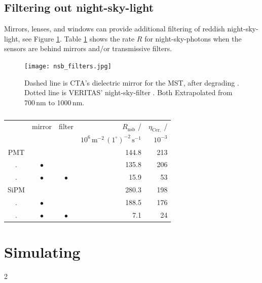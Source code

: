 \documentclass{article}%
\begin{document}
\begin{multicols}{2}
\subsection*{Filtering out night-sky-light}%
\label{SubSecFilteringOutNightSkyLight}%
%
Mirrors, lenses, and windows can provide additional filtering of reddish night-sky-light, see Figure \ref{FigNsbFilter}.
%
Table \ref{TabFilters} shows the rate $R$ for night-sky-photons when the sensors are behind mirrors and/or transmissive filters.
%
\begin{figure}[H]%
\centering%
\texttt{[image: nsb\_filters.jpg]}%
\caption{
Dashed line is CTA's dielectric mirror for the MST, after degrading \cite{pareschi2013status,pareschi2013statusarxiv}.
%
Dotted line is VERITAS' night-sky-filter \cite{archambault2017gamma}.
%
Both Extrapolated from 700\,nm to 1000\,nm.
}%
\label{FigNsbFilter}
\end{figure}
%
\begin{table}[H]
  \begin{center}
    \begin{tabular}{cccrr}
              & \footnotesize{mirror} & \footnotesize{filter} & $R_\text{nsb}$ /   & $\eta_\text{Cer.}$ / \\
              &        &        & \footnotesize{$10^6\,\text{m}^{-2}\,(1^\circ)^{-2}\,\text{s}^{-1}$} & \footnotesize{$10^{-3}$} \\
        \hline
        PMT &             &             & 144.8 & 213\\
        .   & $\bullet{}$ &             & 135.8 & 206\\
        .   & $\bullet{}$ & $\bullet{}$ &  15.9 &  53\\
        \hline
        SiPM &             &             & 280.3 & 198\\
        .    & $\bullet{}$ &             & 188.5 & 176\\
        .    & $\bullet{}$ & $\bullet{}$ &   7.1 &  24\\
    \end{tabular}
    \caption{}
    \label{TabFilters}
  \end{center}
\end{table}
%
\section*{Simulating}%
\label{SecSimulating}%
%
%
%
\end{multicols}{2}%
\end{document}
